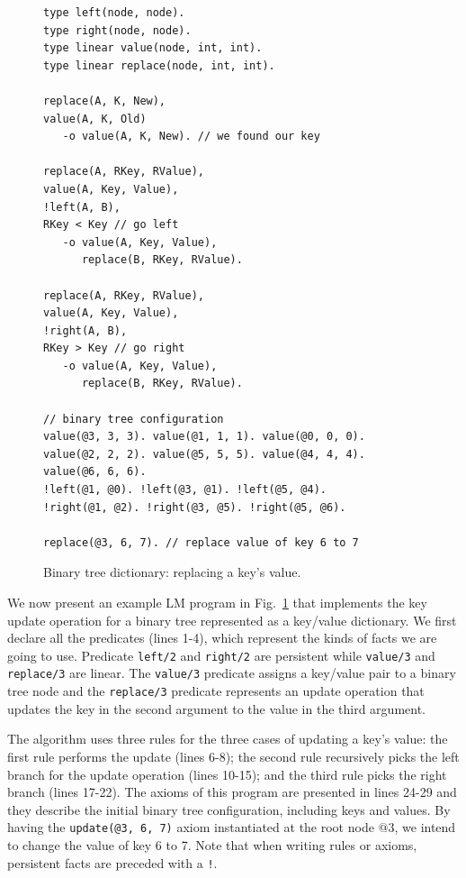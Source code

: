 \begin{figure}[t]
{\footnotesize
\begin{Verbatim}[numbers=right]
type left(node, node).
type right(node, node).
type linear value(node, int, int).
type linear replace(node, int, int).

replace(A, K, New),
value(A, K, Old)
   -o value(A, K, New). // we found our key

replace(A, RKey, RValue),
value(A, Key, Value),
!left(A, B),
RKey < Key // go left
   -o value(A, Key, Value),
      replace(B, RKey, RValue).

replace(A, RKey, RValue),
value(A, Key, Value),
!right(A, B),
RKey > Key // go right
   -o value(A, Key, Value),
      replace(B, RKey, RValue).

// binary tree configuration
value(@3, 3, 3). value(@1, 1, 1). value(@0, 0, 0).
value(@2, 2, 2). value(@5, 5, 5). value(@4, 4, 4).
value(@6, 6, 6).
!left(@1, @0). !left(@3, @1). !left(@5, @4). 
!right(@1, @2). !right(@3, @5). !right(@5, @6).

replace(@3, 6, 7). // replace value of key 6 to 7
\end{Verbatim}
}
\caption{Binary tree dictionary: replacing a key's value.}
  \label{code:btree_replace}
\end{figure}


We now present an example LM program in Fig.~\ref{code:btree_replace} that implements the key update operation for a binary tree
represented as a key/value dictionary.
We first declare all the predicates (lines 1-4), which represent the kinds of facts we are going to use.
Predicate \texttt{left/2} and \texttt{right/2} are persistent while \texttt{value/3} and \texttt{replace/3} are linear.
The \texttt{value/3} predicate assigns a key/value pair to a binary tree node and the \texttt{replace/3} predicate
represents an update operation that updates the key in the second argument to the value in the third argument.

The algorithm uses three rules for the three cases of updating a key's value: the first rule performs the update
(lines 6-8); the second rule recursively picks the left branch for the update operation (lines 10-15); and the third
rule picks the right branch (lines 17-22).
The axioms of this program are presented in lines 24-29 and they describe the initial binary tree configuration,
including keys and values. By having the \texttt{update(@3, 6, 7)} axiom instantiated at the root node $@3$, we intend to
change the value of key 6 to 7.
Note that when writing rules or axioms, persistent facts are preceded with a \texttt{!}.

